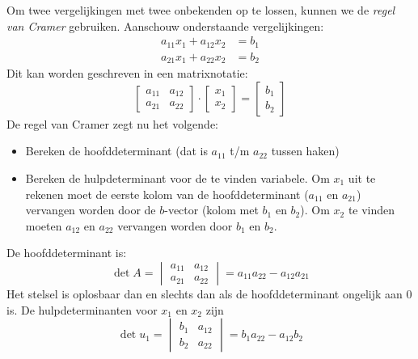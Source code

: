 Om twee vergelijkingen met twee onbekenden op te lossen, kunnen we de \textsl{regel van Cramer} gebruiken. Aanschouw onderstaande vergelijkingen:
%
\begin{equation}
\begin{split}
a_{11}x_1 + a_{12}x_2 &= b_1 \\
a_{21}x_1 + a_{22}x_2 &= b_2
\end{split}
\end{equation}
%
Dit kan worden geschreven in een matrixnotatie:
%
\begin{equation}
\begin{bmatrix}
a_{11} & a_{12} \\
a_{21} & a_{22}
\end{bmatrix} \cdot
\begin{bmatrix}
x_1 \\
x_2
\end{bmatrix} =
\begin{bmatrix}
b_1 \\
b_2
\end{bmatrix}
\end{equation}
%
De regel van Cramer zegt nu het volgende:
\begin{itemize}
\item Bereken de hoofddeterminant (dat is $a_{11}$ t/m $a_{22}$ tussen haken)
\item Bereken de hulpdeterminant voor de te vinden variabele. Om $x_1$ uit te rekenen moet de eerste
kolom van de hoofddeterminant ($a_{11}$ en $a_{21}$) vervangen worden door de $b$-vector (kolom met
$b_1$ en $b_2$). Om $x_2$ te vinden moeten $a_{12}$ en $a_{22}$ vervangen worden door $b_1$ en $b_2$.
\end{itemize}
%
De hoofddeterminant is:
%
\begin{equation}
\det A = \begin{vmatrix}
a_{11} & a_{12} \\
a_{21} & a_{22}
\end{vmatrix} = a_{11}a_{22} - a_{12}a_{21}
\end{equation}
%
Het stelsel is oplosbaar dan en slechts dan als de hoofddeterminant ongelijk aan 0 is.
%
De hulpdeterminanten voor $x_1$ en $x_2$ zijn
%
\begin{equation}
\det u_1 = \begin{vmatrix}
b_{1} & a_{12} \\
b_{2} & a_{22}
\end{vmatrix} = b_{1}a_{22} - a_{12}b_{2}
\end{equation}
%
